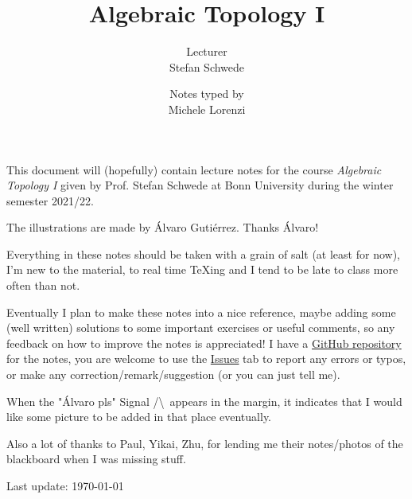 \documentclass[a4paper, 10pt, oneside, DIV=9, chapterprefix=true, numbers=enddot,bibliography=totoc]{scrbook}
\title{Algebraic Topology I}
\author{{\normalsize Lecturer}\\
	Stefan Schwede}
\date{{\normalsize Notes typed by}\\
	Michele Lorenzi}
\begin{document}
\setlength{\parindent}{0pt}
\setlength{\parskip}{4pt}

\frontmatter
{}
\renewcommand{\thedummy}{\arabic{dummy}}
\maketitle
This document will (hopefully) contain lecture notes for the course \emph{Algebraic Topology I} given by Prof. Stefan Schwede at Bonn University during the winter semester 2021/22.

The illustrations are made by \'Alvaro Guti\'errez. Thanks \'Alvaro!

Everything in these notes should be taken with a grain of salt (at least for now), I'm new to the material, to real time \TeX ing and I tend to be late to class more often than not.

Eventually I plan to make these notes into a nice reference, maybe adding some (well written) solutions to some important exercises or useful comments, so any feedback on how to improve the notes is appreciated! I have a \href{https://github.com/lrnmhl/AT1}{GitHub repository} for the notes, you are welcome to use the \href{https://github.com/lrnmhl/AT1/issues}{Issues} tab to report any errors or typos, or make any correction/remark/suggestion (or you can just tell me).

When the "\'Alvaro pls" Signal /\textbackslash\ appears in the margin, it indicates that I would like some picture to be added in that place eventually.

Also a lot of thanks to Paul, Yikai, Zhu, for lending me their notes/photos of the blackboard when I was missing stuff.

\hrulefill

Last update: \today
	
	
	
\tableofcontents
{}
\setcounter{llecture}{0}
\mainmatter{}
\renewcommand{\thedummy}{\thechapter.\arabic{dummy}}
\renewcommand{\thechapter}{\arabic{chapter}}




















\nocite{*}


\backmatter{}
\printbibliography[heading=bibintoc, title={References}]
\end{document}
